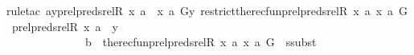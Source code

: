 \begin{isabellebody}
{\isacharparenleft}{\kern0pt}rule{\isacharunderscore}{\kern0pt}tac\ a{\isacharequal}{\kern0pt}{\isachardoublequoteopen}{\isacharparenleft}{\kern0pt}{\isasymlambda}y{\isasymin}prel{\isacharparenleft}{\kern0pt}preds{\isacharunderscore}{\kern0pt}rel{\isacharparenleft}{\kern0pt}R{\isacharcomma}{\kern0pt}\ x{\isacharparenright}{\kern0pt}{\isacharcomma}{\kern0pt}\ {\isacharbraceleft}{\kern0pt}a{\isacharbraceright}{\kern0pt}{\isacharparenright}{\kern0pt}\ {\isacharminus}{\kern0pt}{\isacharbackquote}{\kern0pt}{\isacharbackquote}{\kern0pt}\ {\isacharbraceleft}{\kern0pt}{\isasymlangle}x{\isacharcomma}{\kern0pt}\ a{\isasymrangle}{\isacharbraceright}{\kern0pt}{\isachardot}{\kern0pt}\ G{\isacharparenleft}{\kern0pt}y{\isacharcomma}{\kern0pt}\ restrict{\isacharparenleft}{\kern0pt}the{\isacharunderscore}{\kern0pt}recfun{\isacharparenleft}{\kern0pt}prel{\isacharparenleft}{\kern0pt}preds{\isacharunderscore}{\kern0pt}rel{\isacharparenleft}{\kern0pt}R{\isacharcomma}{\kern0pt}\ x{\isacharparenright}{\kern0pt}{\isacharcomma}{\kern0pt}\ {\isacharbraceleft}{\kern0pt}a{\isacharbraceright}{\kern0pt}{\isacharparenright}{\kern0pt}{\isacharcomma}{\kern0pt}\ {\isasymlangle}x{\isacharcomma}{\kern0pt}\ a{\isasymrangle}{\isacharcomma}{\kern0pt}\ G{\isacharparenright}{\kern0pt}{\isacharcomma}{\kern0pt}\ prel{\isacharparenleft}{\kern0pt}preds{\isacharunderscore}{\kern0pt}rel{\isacharparenleft}{\kern0pt}R{\isacharcomma}{\kern0pt}\ x{\isacharparenright}{\kern0pt}{\isacharcomma}{\kern0pt}\ {\isacharbraceleft}{\kern0pt}a{\isacharbraceright}{\kern0pt}{\isacharparenright}{\kern0pt}\ {\isacharminus}{\kern0pt}{\isacharbackquote}{\kern0pt}{\isacharbackquote}{\kern0pt}\ {\isacharbraceleft}{\kern0pt}y{\isacharbraceright}{\kern0pt}{\isacharparenright}{\kern0pt}{\isacharparenright}{\kern0pt}{\isacharparenright}{\kern0pt}{\isachardoublequoteclose}\isanewline
\ \ \ \ \ \ \ \ \ \ \ \ \ \ b\ {\isacharequal}{\kern0pt}\ {\isachardoublequoteopen}the{\isacharunderscore}{\kern0pt}recfun{\isacharparenleft}{\kern0pt}prel{\isacharparenleft}{\kern0pt}preds{\isacharunderscore}{\kern0pt}rel{\isacharparenleft}{\kern0pt}R{\isacharcomma}{\kern0pt}\ x{\isacharparenright}{\kern0pt}{\isacharcomma}{\kern0pt}\ {\isacharbraceleft}{\kern0pt}a{\isacharbraceright}{\kern0pt}{\isacharparenright}{\kern0pt}{\isacharcomma}{\kern0pt}\ {\isasymlangle}x{\isacharcomma}{\kern0pt}\ a{\isasymrangle}{\isacharcomma}{\kern0pt}\ G{\isacharparenright}{\kern0pt}{\isachardoublequoteclose}\ \ ssubst{\isacharparenright}{\kern0pt}\ \isanewline
\ \ \ \isamarkupfalse%

\end{isabellebody}
